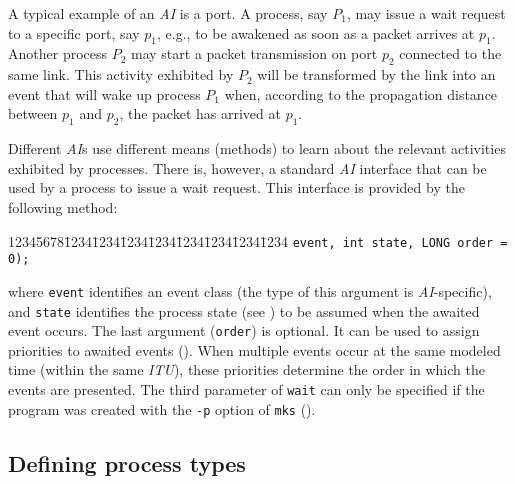 A typical example of an {\em AI\/} is a port.
A process, say $P_1$, may issue a wait request to a specific port,
say $p_1$, e.g.,
to be awakened as soon as a packet arrives at $p_1$.
Another process $P_2$ may start a packet transmission on port $p_2$
connected to the same link.
This activity exhibited by $P_2$ will be transformed by the link into an
event that will wake up process $P_1$ when, according to the propagation
distance between $p_1$ and $p_2$, the packet has arrived at $p_1$.

Different {\em AI\/}s use different means (methods) to learn about the relevant
activities exhibited by processes.
There is, however, a standard {\em AI\/} interface that can be
used by a process to issue a wait request.
This interface is provided by the following method:
{\tt\begin{tabbing}
12345678\=1234\=1234\=1234\=1234\=1234\=1234\=1234\=1234\kill
{} {\tt event, int state, LONG order = 0);}
\end{tabbing}}
\noindent
where {\tt event} identifies an event class (the type of this argument is
{\em AI\/}-specific), and {\tt state} identifies the process state
(see ) to be assumed when the awaited event occurs.
The last argument ({\tt order}) is optional.
It can be used to assign priorities to awaited events ().
When multiple events occur at the same modeled time (within the same
{\em ITU\/}), these priorities determine the order in which the events
are presented.
The third parameter of {\tt wait} can only be specified if the
program was created with the {\tt -p} option of {\tt mks} ().

\subsection{Defining process types}
\label{rm_pr_dp}

